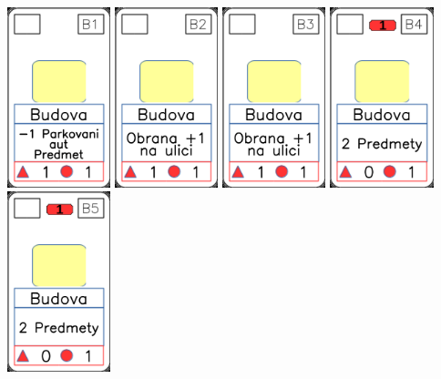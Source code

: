 \documentclass[a4paper]{article}
\begin{document}
	\includegraphics[width=3.0cm]{img-1_5}
	\includegraphics[width=3.0cm]{img-1_6}
	\includegraphics[width=3.0cm]{img-1_7}
	\includegraphics[width=3.0cm]{img-1_8}
	\includegraphics[width=3.0cm]{img-1_9}
\end{document}
